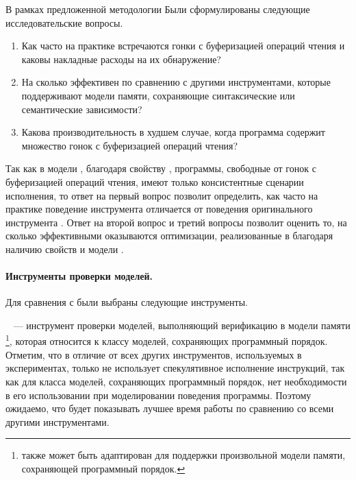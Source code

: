 В рамках предложенной методологии Были 
сформулированы следующие исследовательские вопросы.
\begin{enumerate}

  \item[\RQ{1}] 
    Как часто на практике встречаются гонки с буферизацией операций чтения
    и каковы накладные расходы на их обнаружение?

  \item[\RQ{2}] 
    На сколько эффективен \wmc по сравнению с другими инструментами, 
    которые поддерживают модели памяти, 
    сохраняющие синтаксические или семантические зависимости? 

  \item[\RQ{3}] 
    Какова производительность \wmc в худшем случае, 
    когда программа содержит множество гонок с буферизацией операций чтения? 
    
\end{enumerate}

Так как в модели \WkmS, благодаря свойству \LBRF, программы, 
свободные от гонок с буферизацией операций чтения, 
имеют только \RCMM консистентные сценарии исполнения, 
то ответ на первый вопрос позволит определить, как часто 
на практике поведение инструмента \wmc отличается от поведения 
оригинального инструмента \genmc.
Ответ на второй вопрос и третий вопросы позволит оценить то, на сколько эффективными 
оказываются оптимизации, реализованные в \wmc благодаря 
наличию свойств \LBRF и \CL  модели \WkmS.


\paragraph{Инструменты проверки моделей.}

Для сравнения с  \wmc были выбраны следующие инструменты. 

\textbf{\genmc}~\cite{Kokologiannakis:PLDI2019,Kokologiannakis:CAD2021} ---
инструмент проверки моделей, выполняющий верификацию в модели памяти \RCMM%
\footnote{\genmc также может быть адаптирован для поддержки 
  произвольной модели памяти, сохраняющей программный порядок.}, 
которая относится к классу моделей, сохраняющих программный порядок.  
Отметим, что в отличие от всех других инструментов, используемых в экспериментах, 
только \genmc не использует спекулятивное исполнение инструкций, так как для класса моделей, сохраняющих программный порядок,
нет необходимости в его использовании при моделировании поведения программы. 
Поэтому ожидаемо, что \genmc будет показывать 
лучшее время работы по сравнению со всеми другими инструментами. 

